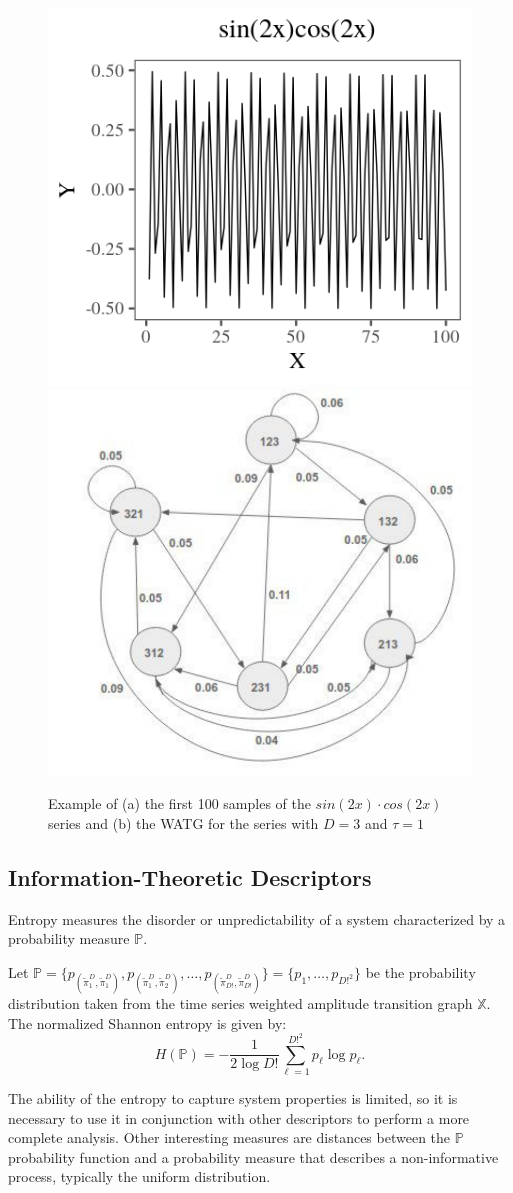 \documentclass{isprs}
\begin{document}
\begin{figure}[hbt]
	\centering
	\includegraphics[width=.45\linewidth]{Figures/plotsincos.png}
	\includegraphics[width=.4\linewidth]{Figures/graph.pdf}
	\caption{Example of (a) the first 100 samples of the $sin (2x) \cdot cos (2x)$ series and (b) the WATG for the series with $D = 3$ and $\tau = 1$}\label{fig:series}
\end{figure} 

\subsection{Information-Theoretic Descriptors}\label{HC}

Entropy measures the disorder or unpredictability of a system characterized by a probability measure $\mathbb{P}$.

Let $\mathbb{P} = \{p_{(\widetilde\pi^D_1, \widetilde\pi^D_1)}, p_{(\widetilde\pi^D_1, \widetilde\pi^D_2)}, \dots, p_{(\widetilde\pi^D_{D!}, \widetilde\pi^D_{D!})} \} = \{p_1,\dots,p_{D!^2}\}$ be the probability distribution taken from the time series weighted amplitude transition graph $\mathbb{X}$.
The normalized Shannon entropy is given by:	
\begin{equation}
H(\mathbb{P}) = -\frac1{2\log D!}\sum_{\ell=1}^{D!^2} p_{\ell} \log p_{\ell} .
\label{eq:Entropia}
\end{equation}

The ability of the entropy to capture system properties is limited, so it is necessary to use it in conjunction with other des\-criptors to perform a more complete analysis.
Other interesting measures are distances between the $\mathbb{P}$ probability function and a probability measure that describes a non-informative process, typically the uniform distribution.
\end{document}
